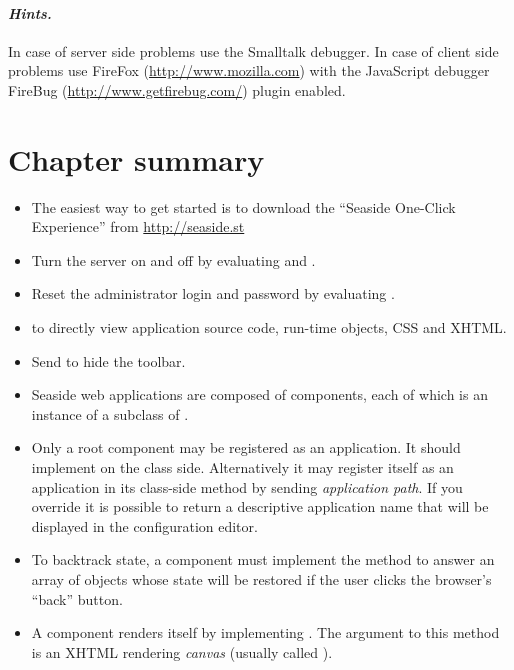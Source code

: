 \documentclass[a4paper,10pt,twoside]{book}
\begin{document}
\paragraph{\emph{Hints.}}
In case of server side problems use the Smalltalk debugger.
In case of client side problems use FireFox (\url{http://www.mozilla.com}) with the JavaScript debugger FireBug (\url{http://www.getfirebug.com/}) plugin enabled.

\section{Chapter summary}

\begin{itemize}
  \item The easiest way to get started is to download the ``Seaside One-Click Experience'' from \url{http://seaside.st}
  \item Turn the server on and off by evaluating  and .
  \item Reset the administrator login and password by evaluating .
  \item {} to directly view application source code, run-time objects, CSS and XHTML.
  \item Send  to hide the toolbar.
  \item Seaside web applications are composed of components, each of which is an instance of a subclass of .
  \item Only a root component may be registered as an application. It should implement  on the class side. Alternatively it may register itself as an application in its class-side  method by sending  \emph{application path}.
  If you override  it is possible to return a descriptive application name that will be displayed in the configuration editor.
  \item To backtrack state, a component must implement the  method to answer an array of objects whose state will be restored if the user clicks the browser's ``back'' button.
  \item A component renders itself by implementing .
  The argument to this method is an XHTML rendering \emph{canvas} (usually called ).

\end{itemize}
\end{document}
